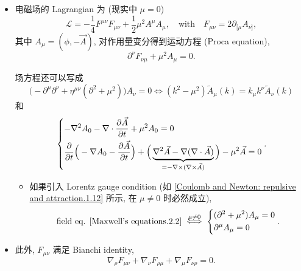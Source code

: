 \begin{itemize}
	\item 电磁场的 Lagrangian 为 (现实中 $\mu = 0$)
	\begin{equation} \label{Maxwell's equations.2.1}
		\mathcal{L} = - \frac{1}{4} F^{\mu \nu} F_{\mu \nu} + \frac{1}{2} \mu^2 A^\mu A_\mu, \quad \text{with} \quad F_{\mu \nu} = 2 \partial_{[\mu} A_{\nu]},
	\end{equation}
	其中 $A_\mu = (\phi, - \vec{A})$, 对作用量变分得到运动方程 (Proca equation),
	\begin{equation} \label{Maxwell's equations.2.2}
		\partial^\nu F_{\nu \mu} + \mu^2 A_\mu = 0.
	\end{equation}
	
	\begin{tcolorbox}[title=calculation:]
		场方程还可以写成
		\begin{equation}
			\Big( - \partial^\mu \partial^\nu + \eta^{\mu \nu} (\partial^2 + \mu^2) \Big) A_\nu = 0 \iff (k^2 - \mu^2) \tilde{A}_\mu(k) = k_\mu k^\nu \tilde{A}_\nu(k)
		\end{equation}
		和
		\begin{equation}
			\begin{dcases}
				- \nabla^2 A_0 - \nabla \cdot \frac{\partial \vec{A}}{\partial t} + \mu^2 A_0 = 0 \\
				\frac{\partial}{\partial t} \Big( - \nabla A_0 - \frac{\partial \vec{A}}{\partial t} \Big) + \Big( \underbrace{\nabla^2 \vec{A} - \nabla (\nabla \cdot \vec{A})}_{= - \nabla \times (\nabla \times \vec{A})} \Big) - \mu^2 \vec{A} = 0
			\end{dcases}.
		\end{equation}
	\end{tcolorbox}
	
	\begin{itemize}
		\item 如果引入 Lorentz gauge condition (如 \eqref{Coulomb and Newton: repulsive and attraction.1.12} 所示, 在 $\mu \neq 0$ 时必然成立),
		\begin{equation}
			\text{field eq. \eqref{Maxwell's equations.2.2}} \overset{\mu \neq 0}{\iff} \begin{dcases}
				(\partial^2 + \mu^2) A_\mu = 0 \\
				\partial^\mu A_\mu = 0
			\end{dcases}.
		\end{equation}
	\end{itemize}
	
	\item 此外, $F_{\mu \nu}$ 满足 Bianchi identity,
	\begin{equation} \label{Maxwell's equations.2.4}
		\nabla_\rho F_{\mu \nu} + \nabla_\nu F_{\rho \mu} + \nabla_\mu F_{\nu \rho} = 0.
	\end{equation}
	

\end{itemize}
